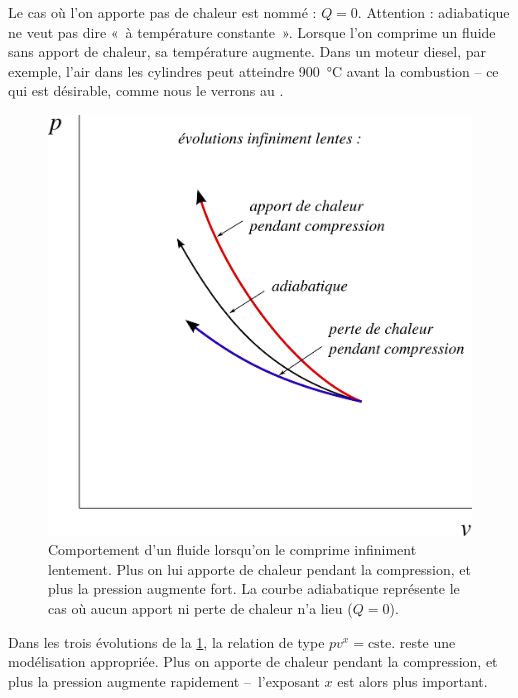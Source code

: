 		Le cas où l’on apporte pas de chaleur est nommé  : $Q = 0$. Attention : adiabatique ne veut pas dire «~à température constante~». Lorsque l’on comprime un fluide sans apport de chaleur, sa température augmente. Dans un moteur diesel, par exemple, l’air dans les cylindres peut atteindre \SI{900}{\degreeCelsius} avant la combustion -- ce qui est désirable, comme nous le verrons au \courssept.

		\begin{figure}
			\begin{center}
			\includegraphics[width=\textwidth]{images/pv_transfert_chaleur.png}
			\end{center}
			\caption{Comportement d’un fluide lorsqu’on le comprime infiniment lentement.
Plus on lui apporte de chaleur pendant la compression, et plus la pression augmente fort. La courbe adiabatique représente le cas où aucun apport ni perte de chaleur n’a lieu ($Q = 0$).}
			\label{fig_p-v_ajout_retrait_chaleur}
		\end{figure}


		Dans les trois évolutions de la \cref{fig_p-v_ajout_retrait_chaleur}, la relation de type $p v^{x} = \text{cste.}$ reste une modélisation appropriée. Plus on apporte de chaleur pendant la compression, et plus la pression augmente rapidement --\ l’exposant $x$ est alors plus important.

